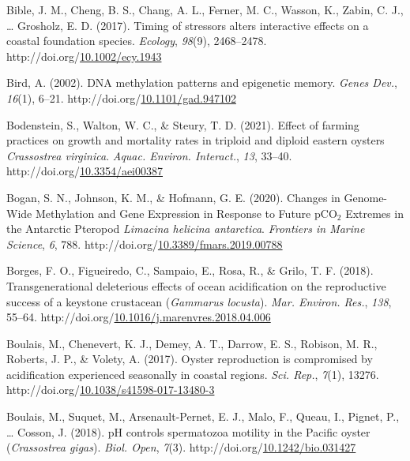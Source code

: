 \documentclass [11pt, proquest] {uwthesis}[2015/03/03]
\newlength{\cslhangindent}
\newenvironment{CSLReferences}%
{\setlength{\parindent}{0pt}%
\everypar{\setlength{\hangindent}{\cslhangindent}}\ignorespaces}%
{\par}
\begin{document}
\begin{CSLReferences}{1}{0}
\leavevmode\hypertarget{ref-Bible2017}{}%
Bible, J. M., Cheng, B. S., Chang, A. L., Ferner, M. C., Wasson, K., Zabin, C. J., \ldots{} Grosholz, E. D. (2017). {Timing of stressors alters interactive effects on a coastal foundation species}. \emph{Ecology}, \emph{98}(9), 2468--2478. http://doi.org/\href{https://doi.org/10.1002/ecy.1943}{10.1002/ecy.1943}

\leavevmode\hypertarget{ref-Bird2002}{}%
Bird, A. (2002). {DNA methylation patterns and epigenetic memory}. \emph{Genes Dev.}, \emph{16}(1), 6--21. http://doi.org/\href{https://doi.org/10.1101/gad.947102}{10.1101/gad.947102}

\leavevmode\hypertarget{ref-Bodenstein2021}{}%
Bodenstein, S., Walton, W. C., \& Steury, T. D. (2021). {Effect of farming practices on growth and mortality rates in triploid and diploid eastern oysters \emph{Crassostrea virginica}}. \emph{Aquac. Environ. Interact.}, \emph{13}, 33--40. http://doi.org/\href{https://doi.org/10.3354/aei00387}{10.3354/aei00387}

\leavevmode\hypertarget{ref-Bogan2020}{}%
Bogan, S. N., Johnson, K. M., \& Hofmann, G. E. (2020). {Changes in Genome-Wide Methylation and Gene Expression in Response to Future {pCO\(_2\)} Extremes in the Antarctic Pteropod \emph{Limacina helicina antarctica}}. \emph{Frontiers in Marine Science}, \emph{6}, 788. http://doi.org/\href{https://doi.org/10.3389/fmars.2019.00788}{10.3389/fmars.2019.00788}

\leavevmode\hypertarget{ref-Borges2018}{}%
Borges, F. O., Figueiredo, C., Sampaio, E., Rosa, R., \& Grilo, T. F. (2018). {Transgenerational deleterious effects of ocean acidification on the reproductive success of a keystone crustacean (\emph{Gammarus locusta})}. \emph{Mar. Environ. Res.}, \emph{138}, 55--64. http://doi.org/\href{https://doi.org/10.1016/j.marenvres.2018.04.006}{10.1016/j.marenvres.2018.04.006}

\leavevmode\hypertarget{ref-Boulais2017}{}%
Boulais, M., Chenevert, K. J., Demey, A. T., Darrow, E. S., Robison, M. R., Roberts, J. P., \& Volety, A. (2017). {Oyster reproduction is compromised by acidification experienced seasonally in coastal regions}. \emph{Sci. Rep.}, \emph{7}(1), 13276. http://doi.org/\href{https://doi.org/10.1038/s41598-017-13480-3}{10.1038/s41598-017-13480-3}

\leavevmode\hypertarget{ref-Boulais2018}{}%
Boulais, M., Suquet, M., Arsenault-Pernet, E. J., Malo, F., Queau, I., Pignet, P., \ldots{} Cosson, J. (2018). {pH controls spermatozoa motility in the Pacific oyster (\emph{Crassostrea gigas})}. \emph{Biol. Open}, \emph{7}(3). http://doi.org/\href{https://doi.org/10.1242/bio.031427}{10.1242/bio.031427}


\end{CSLReferences}
\end{document}
